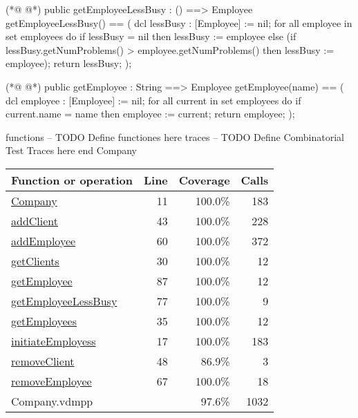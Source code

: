 \begin{vdmpp}[breaklines=true]
(*@
\label{getEmployeeLessBusy:77}
@*)
 public getEmployeeLessBusy : () ==> Employee
 getEmployeeLessBusy() == (
 dcl lessBusy : [Employee] := nil;
 for all employee in set employees do
  if lessBusy = nil
  then lessBusy := employee
  else (if lessBusy.getNumProblems() > employee.getNumProblems() then lessBusy := employee);
 return  lessBusy;
 ); 
 
(*@
\label{getEmployee:87}
@*)
 public getEmployee : String ==> Employee
 getEmployee(name) ==
 (
 dcl employee : [Employee] := nil;
 for all current in set employees do
  if current.name = name
  then employee := current;
 return employee;
 );

functions
-- TODO Define functiones here
traces
-- TODO Define Combinatorial Test Traces here
end Company
\end{vdmpp}
\bigskip
\begin{longtable}{|l|r|r|r|}
\hline
Function or operation & Line & Coverage & Calls \\
\hline
\hline
\hyperref[Company:11]{Company} & 11&100.0\% & 183 \\
\hline
\hyperref[addClient:43]{addClient} & 43&100.0\% & 228 \\
\hline
\hyperref[addEmployee:60]{addEmployee} & 60&100.0\% & 372 \\
\hline
\hyperref[getClients:30]{getClients} & 30&100.0\% & 12 \\
\hline
\hyperref[getEmployee:87]{getEmployee} & 87&100.0\% & 12 \\
\hline
\hyperref[getEmployeeLessBusy:77]{getEmployeeLessBusy} & 77&100.0\% & 9 \\
\hline
\hyperref[getEmployees:35]{getEmployees} & 35&100.0\% & 12 \\
\hline
\hyperref[initiateEmployess:17]{initiateEmployess} & 17&100.0\% & 183 \\
\hline
\hyperref[removeClient:48]{removeClient} & 48&86.9\% & 3 \\
\hline
\hyperref[removeEmployee:67]{removeEmployee} & 67&100.0\% & 18 \\
\hline
\hline
Company.vdmpp & & 97.6\% & 1032 \\
\hline
\end{longtable}

